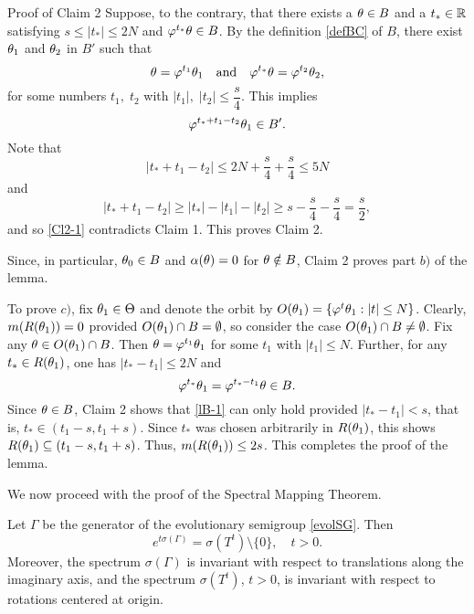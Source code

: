 \begin{pf}
\begin{pf*}{Proof of Claim 2}  Suppose, to the contrary,
that there exists a $\theta\in B$ and a $t_{*}\in{\Bbb{R}}$ satisfying
$s\le |t_{*}| \le 2N$ and $\varphi^{t_{*}}\theta\in B$.
By the definition \eqref{defBC} of $B$,
there exist $\theta_1$ and $\theta_2$ in $B'$ such that
\[
\theta=\varphi^{t_1}\theta_1 \quad\text{and}\quad \varphi^{t_{*}}\theta
=\varphi^{t_{2}}\theta_2,
\]
for some numbers $t_1,\;t_2$ with $|t_1|,\;|t_2|\le\dfrac{s}{4}$.
This implies
\begin{equation}\lb{Cl2-1}
\varphi^{t_{*} + t_{1}-t_{2}}\th_1 \in B'.
\end{equation}
Note that
$$
|t_{*}+t_1-t_2|\le 2N + \dfrac{s}{4} + \dfrac{s}{4} \le 5N
$$
and
$$
|t_{*}+t_1-t_2|\ge |t_{*}|-|t_1|-|t_2|\ge s-\dfrac{s}{4}-
\dfrac{s}{4} = \dfrac{s}{2},
$$
and so \eqref{Cl2-1} contradicts Claim 1.
This proves Claim 2.
\end{pf*}

Since, in particular, $\theta_0\in B$ and $\alpha(\theta)=0$
for $\theta\notin B$, Claim 2 proves part $b)$ of the lemma.

To prove $c)$, fix $\theta_1\in \Theta$ and denote the orbit by
$O(\theta_1) = \{\varphi^t\theta_1: |t| \le N\}$.
Clearly, $m(R(\theta_1)) =0$ provided $O(\theta_1)\cap B=\emptyset$,
so consider the case $O(\theta_1) \cap B\ne \emptyset$.
Fix any $\theta\in O(\theta_1) \cap B$.  Then $\theta=\varphi^{t_1}\theta_1$
for some $t_1$ with $|t_1| \le N$.
Further, for any $t_{*} \in R(\theta_1)$, one has
$|t_{*}-t_1|\le 2N$ and
\begin{equation}\lb{lB-1}
\vphi^{t_{*}}\th_1 = \vphi^{t_{*}-t_1}\th\in B.
\end{equation}
Since $\theta\in B$, Claim 2 shows that \eqref{lB-1} can only hold
provided $|t_{*} -t_1|<s$, that is, $t_{*} \in (t_1-s, t_1+s)$.
Since $t_{*}$  was chosen arbitrarily in $R(\theta_1)$, this shows
$R(\theta_1) \subseteq (t_1-s,t_1+s)$.  Thus, $m(R(\theta_1)) \le 2s$.
This completes the proof of the lemma.
\end{pf}

We now proceed with the proof of the Spectral Mapping Theorem.

\setcounter{equation}{0} %
\begin{thm}  Let $\Gamma$ be the generator of the
evolutionary semigroup \eqref{evolSG}.  Then
\begin{equation}
e^{t\sigma(\Gamma)}=\sigma(T^t)\setminus \{0\},\quad t>0.
\end{equation}
Moreover, the spectrum $\sigma(\Gamma)$ is invariant with
respect to translations along the imaginary axis, and the spectrum
$\sigma(T^t)$, $t>0$, is invariant with respect to
rotations centered at origin.
\end{thm}
\setcounter{equation}{5} %

